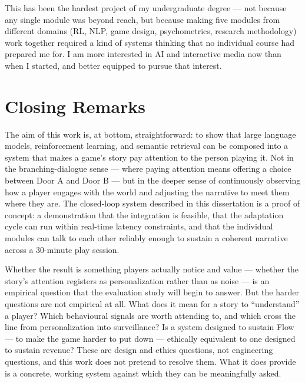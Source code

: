 This has been the hardest project of my undergraduate degree --- not because any single module was beyond reach, but because making five modules from different domains (RL, NLP, game design, psychometrics, research methodology) work together required a kind of systems thinking that no individual course had prepared me for. I am more interested in AI and interactive media now than when I started, and better equipped to pursue that interest.

\section{Closing Remarks}

The aim of this work is, at bottom, straightforward: to show that large language models, reinforcement learning, and semantic retrieval can be composed into a system that makes a game's story pay attention to the person playing it. Not in the branching-dialogue sense --- where paying attention means offering a choice between Door A and Door B --- but in the deeper sense of continuously observing how a player engages with the world and adjusting the narrative to meet them where they are. The closed-loop system described in this dissertation is a proof of concept: a demonstration that the integration is feasible, that the adaptation cycle can run within real-time latency constraints, and that the individual modules can talk to each other reliably enough to sustain a coherent narrative across a 30-minute play session.

Whether the result is something players actually notice and value --- whether the story's attention registers as personalization rather than as noise --- is an empirical question that the evaluation study will begin to answer. But the harder questions are not empirical at all. What does it mean for a story to ``understand'' a player? Which behavioural signals are worth attending to, and which cross the line from personalization into surveillance? Is a system designed to sustain Flow --- to make the game harder to put down --- ethically equivalent to one designed to sustain revenue? These are design and ethics questions, not engineering questions, and this work does not pretend to resolve them. What it does provide is a concrete, working system against which they can be meaningfully asked.
